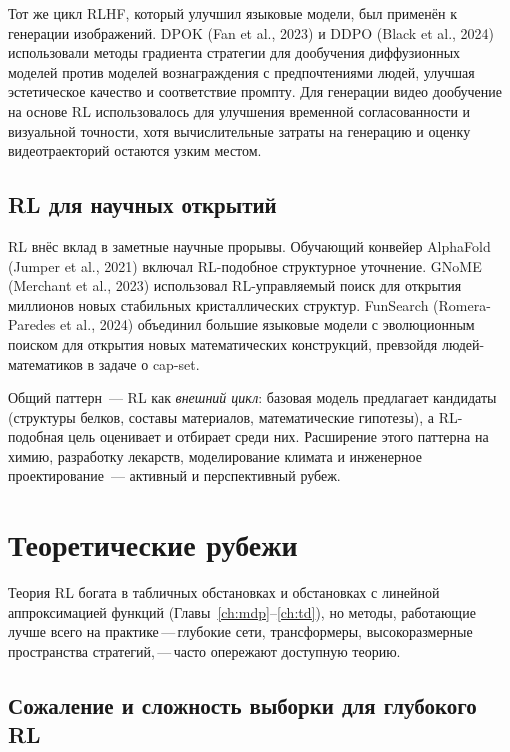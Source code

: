 Тот же цикл RLHF, который улучшил языковые модели, был применён к
генерации изображений. DPOK (Fan et al., 2023) и DDPO (Black et al.,
2024) использовали методы градиента стратегии для дообучения диффузионных моделей
против моделей вознаграждения с предпочтениями людей, улучшая эстетическое качество и
соответствие промпту. Для генерации видео дообучение на основе RL использовалось
для улучшения временной согласованности и визуальной точности, хотя
вычислительные затраты на генерацию и оценку видеотраекторий остаются
узким местом.

\subsection{RL для научных открытий}

RL внёс вклад в заметные научные прорывы. Обучающий конвейер AlphaFold
(Jumper et al., 2021) включал RL-подобное структурное уточнение. GNoME (Merchant et al., 2023) использовал RL-управляемый
поиск для открытия миллионов новых стабильных кристаллических структур.
FunSearch (Romera-Paredes et al., 2024) объединил большие языковые модели
с эволюционным поиском для открытия новых математических конструкций,
превзойдя людей-математиков в задаче о cap-set.

Общий паттерн~--- RL как \emph{внешний цикл}: базовая модель
предлагает кандидаты (структуры белков, составы материалов,
математические гипотезы), а RL-подобная цель оценивает и отбирает
среди них. Расширение этого паттерна на химию, разработку лекарств,
моделирование климата и инженерное проектирование~--- активный и
перспективный рубеж.


\section{Теоретические рубежи}
\label{sec:open-theory}

Теория RL богата в табличных обстановках и обстановках с линейной аппроксимацией функций
(Главы~\ref{ch:mdp}--\ref{ch:td}), но методы, работающие
лучше всего на практике\,---\,глубокие сети, трансформеры, высокоразмерные
пространства стратегий,\,---\,часто опережают доступную теорию.

\subsection{Сожаление и сложность выборки для глубокого RL}

